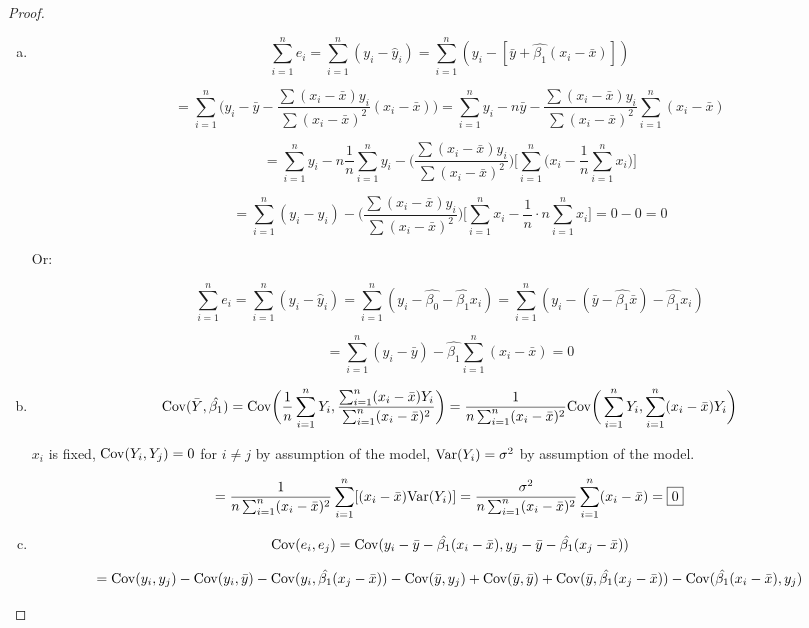 \begin{proof}

\begin{enumerate}[(a)]

\item \[
\sum_{i=1}^n e_i = \sum_{i=1}^n(y_i - \hat{y}_i) = \sum_{i=1}^n(y_i - [\bar{y} + \hat{\beta_1}(x_i - \bar{x})])
\]

\[
= \sum_{i=1}^n\bigg(y_i - \bar{y} - \frac{\sum(x_i - \bar{x}) y_i}{\sum(x_i - \bar{x})^2}(x_i - \bar{x})\bigg)  = \sum_{i=1}^n y_i - n\bar{y} - \frac{\sum(x_i - \bar{x}) y_i}{\sum(x_i - \bar{x})^2} \sum_{i=1}^n (x_i - \bar{x})
\]

\[
= \sum_{i=1}^n y_i - n \frac{1}{n} \sum_{i=1}^n y_i - \bigg( \frac{\sum(x_i -  \bar{x}) y_i}{\sum(x_i - \bar{x})^2} \bigg) \bigg[ \sum_{i=1}^n \bigg( x_i - \frac{1}{n}\sum_{i=1}^n x_i \bigg)\bigg]
\]

\[
= \sum_{i=1}^n (y_i - y_i)  - \bigg( \frac{\sum(x_i -  \bar{x}) y_i}{\sum(x_i - \bar{x})^2} \bigg) \bigg[ \sum_{i=1}^n x_i - \frac{1}{n} \cdot n\sum_{i=1}^n x_i\bigg] = 0 - 0 = \boxed{0}
\]

Or:

\[
\sum_{i=1}^n e_i = \sum_{i=1}^n(y_i - \hat{y}_i) = \sum_{i=1}^n(y_i - \hat{\beta_0} - \hat{\beta_1}x_i) = \sum_{i=1}^n(y_i - (\bar{y} - \hat{\beta_1} \bar{x}) - \hat{\beta_1}x_i) 
\]

\[
= \sum_{i=1}^n(y_i - \bar{y})  - \hat{\beta_1}\sum_{i=1}^n( x_i - \bar{x})  = 0
\]


\item \[
\mathrm{Cov}(\bar{Y}, \hat{\beta_1}) = \mathrm{Cov}\bigg(\frac{1}{n} \sum_{i=1}^n Y_i , \frac{\sum_{i=1}^n (x_i - \bar{x})Y_i}{\sum_{i=1}^n (x_i - \bar{x})^2} \bigg) = \frac{1}{n\sum_{i=1}^n (x_i - \bar{x})^2}\mathrm{Cov}\bigg( \sum_{i=1}^n Y_i , \sum_{i=1}^n (x_i - \bar{x})Y_i\bigg)
\]

\(x_i\) is fixed, \(\mathrm{Cov}(Y_i, Y_j) = 0 \) for \(i \neq j\) by assumption of the model, \(\mathrm{Var}(Y_i) = \sigma^2\) by assumption of the model. 

\[
= \frac{1}{n\sum_{i=1}^n (x_i - \bar{x})^2} \sum_{i=1}^n[(x_i - \bar{x})  \mathrm{Var} ( Y_i)  ] = \frac{\sigma^2}{n\sum_{i=1}^n (x_i - \bar{x})^2} \sum_{i=1}^n(x_i - \bar{x})   = \boxed{0}
\]

\item \[
\mathrm{Cov}(e_i, e_j) = \mathrm{Cov}(y_i - \bar{y} - \hat{\beta_1}(x_i - \bar{x}), y_j - \bar{y} - \hat{\beta_1}(x_j - \bar{x}))
\]

\[
 = \mathrm{Cov}(y_i, y_j) - \mathrm{Cov}(y_i, \bar{y}) - \mathrm{Cov}(y_i, \hat{\beta_1}(x_j - \bar{x})) - \mathrm{Cov}(\bar{y}, y_j)  + \mathrm{Cov}(\bar{y}, \bar{y}) + \mathrm{Cov}(\bar{y}, \hat{\beta_1}(x_j - \bar{x})) - \mathrm{Cov}(\hat{\beta_1}(x_i - \bar{x}), y_j) 
\]


\end{enumerate}
\end{proof}
